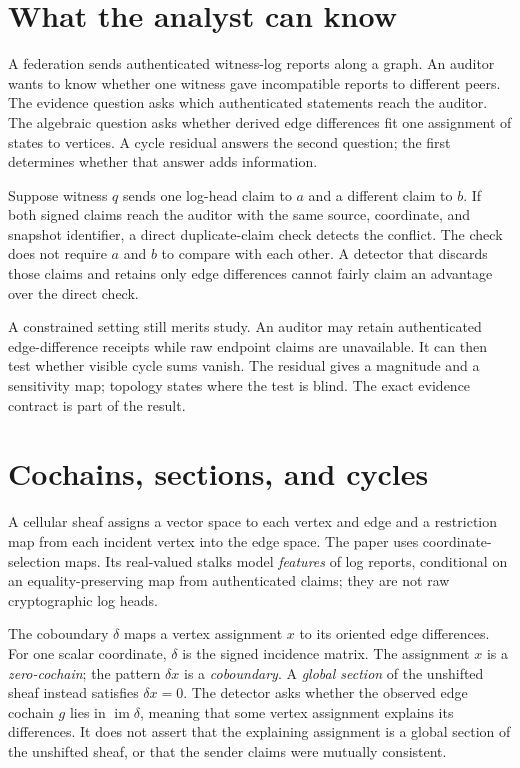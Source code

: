 \documentclass[11pt,a4paper]{article}
\begin{document}
\section{What the analyst can know}\label{sec:problem}

A federation sends authenticated witness-log reports along a graph. An auditor wants to know whether one witness gave
incompatible reports to different peers. The evidence question asks which authenticated statements reach the auditor.
The algebraic question asks whether derived edge differences fit one assignment of states to vertices. A cycle residual
answers the second question; the first determines whether that answer adds information.

Suppose witness $q$ sends one log-head claim to $a$ and a different claim to $b$. If both signed claims reach the auditor
with the same source, coordinate, and snapshot identifier, a direct duplicate-claim check detects the conflict. The
check does not require $a$ and $b$ to compare with each other. A detector that discards those claims and retains only
edge differences cannot fairly claim an advantage over the direct check.

A constrained setting still merits study. An auditor may retain authenticated edge-difference receipts while raw
endpoint claims are unavailable. It can then test whether visible cycle sums vanish. The residual gives a magnitude
and a sensitivity map; topology states where the test is blind. The exact evidence contract is part of the result.

\section{Cochains, sections, and cycles}\label{sec:vocab}

A cellular sheaf assigns a vector space to each vertex and edge and a restriction map from each incident vertex into the
edge space. The paper uses coordinate-selection maps. Its real-valued stalks model \emph{features} of log reports,
conditional on an equality-preserving map from authenticated claims; they are not raw cryptographic log heads.

The coboundary $\delta$ maps a vertex assignment $x$ to its oriented edge differences. For one scalar coordinate,
$\delta$ is the signed incidence matrix. The assignment $x$ is a \emph{zero-cochain}; the pattern $\delta x$ is a
\emph{coboundary}. A \emph{global section} of the unshifted sheaf instead satisfies $\delta x=0$. The detector asks
whether the observed edge cochain $g$ lies in $\operatorname{im}\delta$, meaning that some vertex assignment explains
its differences. It does not assert that the explaining assignment is a global section of the unshifted sheaf, or that
the sender claims were mutually consistent.
\end{document}
